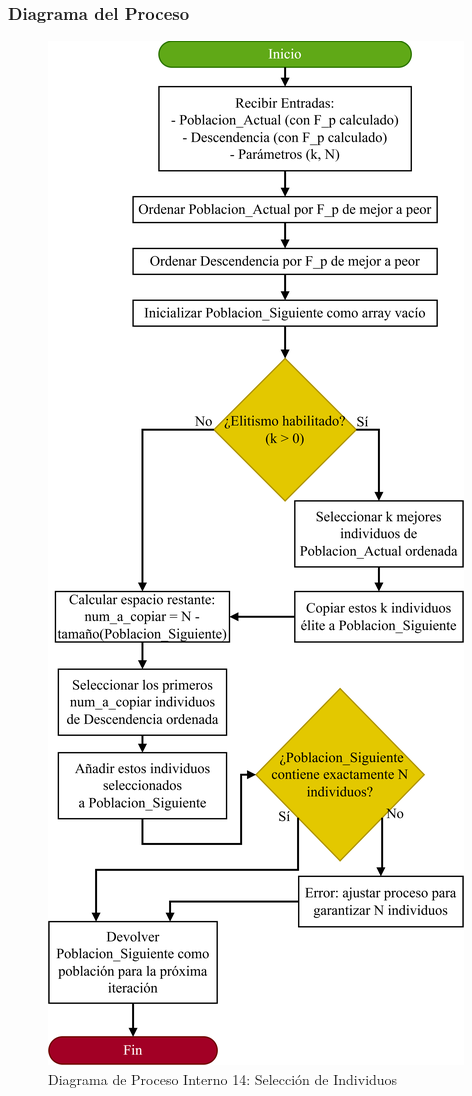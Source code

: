 \subsubsection{Diagrama del Proceso}
\begin{figure}[H]
    \centering
    \includegraphics[width=\textwidth]{img/Analisis/DiagramaProcesos/DiagramaProceso14_SeleccionIndividuos.png}
    \caption{Diagrama de Proceso Interno 14: Selección de Individuos}%
    \label{fig:process_diagram14}
\end{figure}
